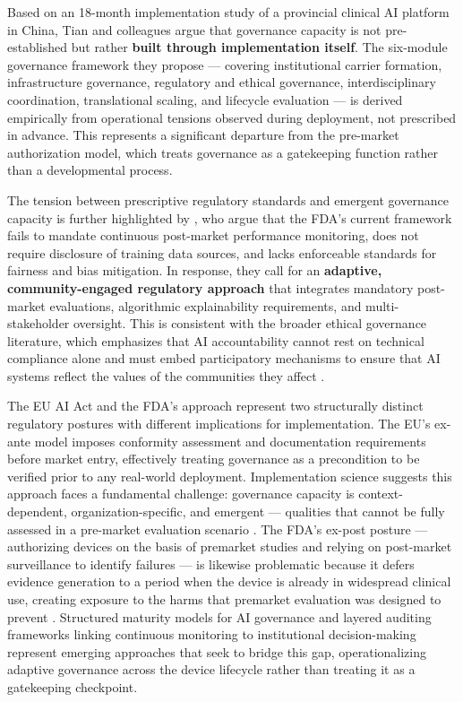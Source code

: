 Based on an 18-month implementation study of a provincial clinical AI platform
in China, Tian and colleagues argue that governance capacity is not
pre-established but rather \textbf{built through implementation itself}. The
six-module governance framework they propose — covering institutional carrier
formation, infrastructure governance, regulatory and ethical governance,
interdisciplinary coordination, translational scaling, and lifecycle evaluation
— is derived empirically from operational tensions observed during deployment,
not prescribed in advance. This represents a significant departure from the
pre-market authorization model, which treats governance as a gatekeeping
function rather than a developmental process.

The tension between prescriptive regulatory standards and emergent governance
capacity is further highlighted by \citet{abulibdeh2025illusion}, who argue
that the FDA's current framework fails to mandate continuous post-market
performance monitoring, does not require disclosure of training data sources,
and lacks enforceable standards for fairness and bias mitigation. In response,
they call for an \textbf{adaptive, community-engaged regulatory approach} that
integrates mandatory post-market evaluations, algorithmic explainability
requirements, and multi-stakeholder oversight. This is consistent with the
broader ethical governance literature, which emphasizes that AI accountability
cannot rest on technical compliance alone and must embed participatory
mechanisms to ensure that AI systems reflect the values of the communities
they affect \citep{bouderhem2025shaping, abdul2025ai}.

The EU AI Act and the FDA's approach represent two structurally distinct
regulatory postures with different implications for implementation. The EU's
ex-ante model imposes conformity assessment and documentation requirements
before market entry, effectively treating governance as a precondition to be
verified prior to any real-world deployment. Implementation science suggests
this approach faces a fundamental challenge: governance capacity is
context-dependent, organization-specific, and emergent — qualities that cannot
be fully assessed in a pre-market evaluation scenario \citep{tian2026pilottrap}.
The FDA's ex-post posture — authorizing devices on the basis of premarket
studies and relying on post-market surveillance to identify failures — is
likewise problematic because it defers evidence generation to a period when
the device is already in widespread clinical use, creating exposure to the
harms that premarket evaluation was designed to prevent \citep{abulibdeh2025illusion}.
Structured maturity models for AI governance \citep{hussein2026governance} and
layered auditing frameworks linking continuous monitoring to institutional
decision-making \citep{palama2026auditing} represent emerging approaches that
seek to bridge this gap, operationalizing adaptive governance across the
device lifecycle rather than treating it as a gatekeeping checkpoint.

